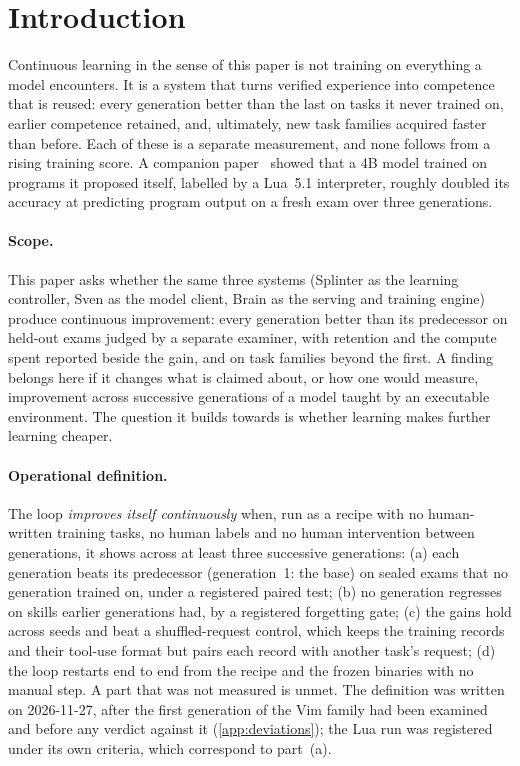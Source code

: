 \section{Introduction}\label{sec:introduction}

Continuous learning in the sense of this paper is not training on everything a model encounters. It is a system that turns
verified experience into competence that is reused: every generation better than the last on tasks it never trained on, earlier
competence retained, and, ultimately, new task families acquired faster than before. Each of these is a separate measurement,
and none follows from a rising training score. A companion paper~\cite{frontier2026} showed that a 4B model trained on programs
it proposed itself, labelled by a Lua~5.1 interpreter, roughly doubled its accuracy at predicting program output on a fresh exam
over three generations.

\paragraph{Scope.} This paper asks whether the same three systems (Splinter as the learning controller, Sven as the model
client, Brain as the serving and training engine) produce continuous improvement: every generation better than its predecessor
on held-out exams judged by a separate examiner, with retention and the compute spent reported beside the gain, and on task
families beyond the first. A finding belongs here if it changes what is claimed about, or how one would measure, improvement
across successive generations of a model taught by an executable environment. The question it builds towards is whether
learning makes further learning cheaper.

\paragraph{Operational definition.} The loop \emph{improves itself continuously} when, run as a recipe
with no human-written training tasks, no human labels and no human intervention between generations, it shows across at least
three successive generations: (a) each generation beats its predecessor (generation~1: the base) on sealed exams that no
generation trained on, under a registered paired test; (b) no generation regresses on skills earlier generations had, by a
registered forgetting gate; (c) the gains hold across seeds and beat a shuffled-request control, which keeps the training
records and their tool-use format but pairs each record with another task's request; (d) the loop restarts end to end from the
recipe and the frozen binaries with no manual step. A part that was not measured is unmet. The definition was written on
2026-11-27, after the first generation of the Vim family had been examined and before any verdict against it
(\cref{app:deviations}); the Lua run was registered under its own criteria, which correspond to part~(a).

